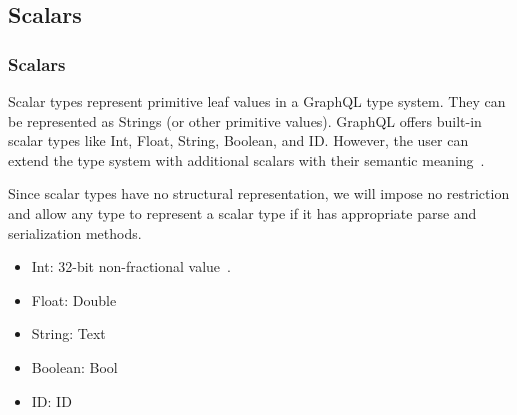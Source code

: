 \subsection{Scalars}
\begin{frame}\frametitle{Scalars}

Scalar types represent primitive leaf values in a GraphQL type system. They can be represented as Strings (or other primitive values). GraphQL offers built-in scalar types like Int, Float, String, Boolean, and ID. However, the user can extend the type system with additional scalars with their semantic meaning~\cite{gql-spec}.

Since scalar types have no structural representation, we will impose no restriction and allow any type to represent a scalar type if it has appropriate parse and serialization methods.

\begin{itemize}

  \item Int:
    32-bit non-fractional value~\cite{gql-spec}. 

  \item Float: Double

  \item String: Text
  \item Boolean: Bool
  \item ID:  ID 
\end{itemize}

\end{frame}

